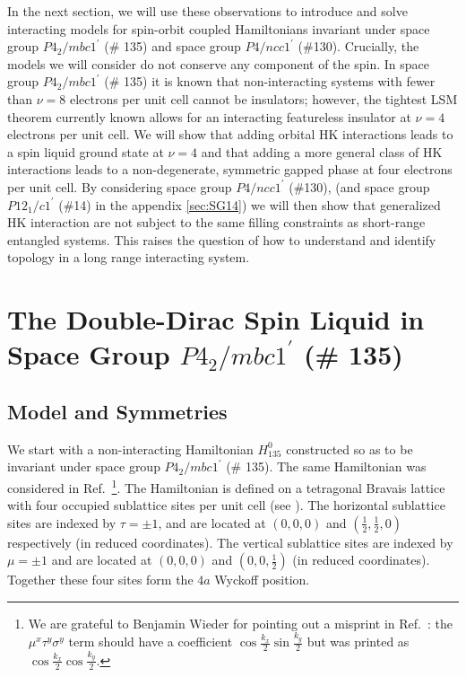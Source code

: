 \documentclass[prb,aps,amssymb,twocolumn,notitlepage]{revtex4-2}
\begin{document}
In the next section, we will use these observations to introduce and solve interacting models for spin-orbit coupled Hamiltonians invariant under space group $P4_2/mbc1^\prime$ (\# 135) and space group $P4/ncc1^\prime$ (\#130). 
Crucially, the models we will consider do not conserve any component of the spin. 
In space group $P4_2/mbc1^\prime$ (\# 135) it is known that non-interacting systems with fewer than $\nu=8$ electrons per unit cell cannot be insulators; however, the tightest LSM theorem currently known allows for an interacting featureless insulator at $\nu=4$ electrons per unit cell. 
We will show that adding orbital HK interactions leads to a spin liquid ground state at $\nu=4$ and that adding a more general class of HK interactions leads to a non-degenerate, symmetric gapped phase at four electrons per unit cell. 
By considering space group $P4/ncc1^\prime$ (\#130), (and space group $P12_{1}/c1^\prime$ (\#14) in the appendix \cref{sec:SG14}) we will then show that generalized HK interaction are not subject to the same filling constraints as short-range entangled systems. 
This raises the question of how to understand and identify topology in a long range interacting system. 


\section{The Double-Dirac Spin Liquid in Space Group $P4_2/mbc1^\prime$ (\# 135)}
\label{sec:DDSL}
\subsection{Model and Symmetries}\label{subsec:ddslmodel}



We start with a non-interacting Hamiltonian $H^{0}_{135}$ constructed so as to be invariant under space group $P4_2/mbc1^\prime$ (\# 135). 
The same Hamiltonian was considered in Ref.~\cite{wieder2016double}\footnote{We are grateful to Benjamin Wieder for pointing out a misprint in Ref.~\cite{wieder2016double}: the $\mu^x\tau^y\sigma^y$ term should have a coefficient $\cos\tfrac{k_x}{2}\sin\tfrac{k_y}{2}$ but was printed as $\cos\tfrac{k_x}{2}\cos\tfrac{k_y}{2}$.}. 
The Hamiltonian is defined on a tetragonal Bravais lattice with four occupied sublattice sites per unit cell (see ).
The horizontal sublattice sites are indexed by $\tau=\pm 1$, and are located at $(0,0,0)$ and $(\tfrac{1}{2},\tfrac{1}{2},0)$ respectively (in reduced coordinates). 
The vertical sublattice sites are indexed by $\mu=\pm 1$ and are located at $(0,0,0)$ and $(0,0,\tfrac{1}{2})$ (in reduced coordinates). 
Together these four sites form the $4a$ Wyckoff position.
\end{document}
